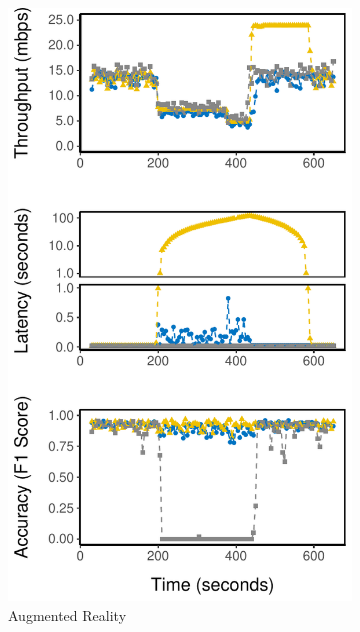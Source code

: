 \begin{figure}
\begin{subfigure}{0.33\textwidth}
    \includegraphics[width=\textwidth]{figures/runtime-darknet-verticle.pdf}
    \caption{Augmented Reality}
    \label{fig:ar-runtime}
  \end{subfigure}
  \hfill
  \begin{subfigure}{0.33\textwidth}

\end{subfigure}
\end{figure}
